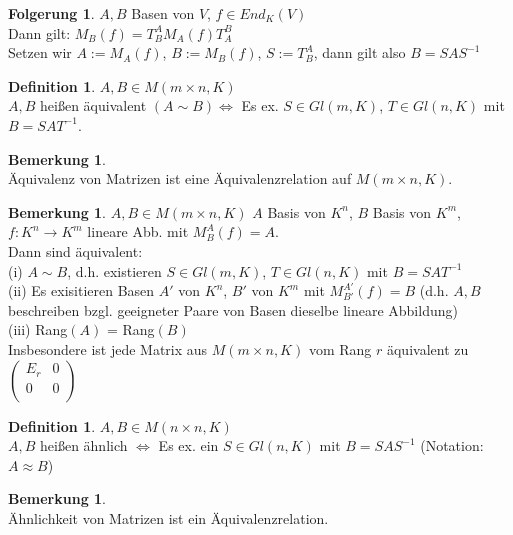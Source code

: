 \documentclass[10pt,a4paper,numbers=endperiod]{scrartcl}
\theoremstyle{definition}
\newtheorem{defi}[satz]{Definition}
\newtheorem{bem}[satz]{Bemerkung}
\newtheorem{folg}[satz]{Folgerung}
\begin{document}
\begin{folg}
	 $A,B$ Basen von $V$, $f \in End_K(V)$\\
	 Dann gilt: $M_B(f) = T_B^A M_A(f) T_A^B$\\
	 Setzen wir $A := M_A(f)$, $ B:= M_B(f)$, $S:= T_B^A$, dann gilt also $B=SAS^{-1}$
\end{folg}

\begin{defi}
	$A,B \in M( m\times n,K)$\\
	$A,B$ heißen äquivalent $(A \sim B) \Leftrightarrow$ Es ex. $S \in Gl(m,K)$, $T \in Gl(n,K)$ mit $B=SAT^{-1}$.
\end{defi}

\begin{bem}
	$ $\\
	Äquivalenz von Matrizen ist eine Äquivalenzrelation auf $M(m \times n, K)$.
\end{bem}

\begin{bem}
	$A,B \in M(m \times n, K)$ $A$ Basis von $K^n$, $B$ Basis von $K^m$, $f:K^n \rightarrow K^m$ lineare Abb. mit $M_B^A(f) = A$.\\
	Dann sind äquivalent:\\
	(i) $A \sim B$, d.h. existieren $S \in Gl(m,K)$, $T \in Gl(n,K)$ mit $B=SAT^{-1}$\\
	(ii) Es exisitieren Basen $A'$ von $K^n$, $B'$ von $K^m$ mit $M_{B'}^{A'}(f) =B$ (d.h. $A,B$ beschreiben bzgl. geeigneter Paare von Basen dieselbe lineare Abbildung)\\
	(iii) Rang$(A)$ = Rang$(B)$\\
	Insbesondere ist jede Matrix aus $M(m\times n, K)$ vom Rang $r$ äquivalent zu $\begin{pmatrix}
	E_r&0\\
	0&0\\
	\end{pmatrix}$
\end{bem}

\begin{defi}
	$A,B \in M(n \times n,K)$\\
	$A,B$ heißen ähnlich $\Leftrightarrow$ Es ex. ein $S \in Gl(n,K)$ mit $B=SAS^{-1}$ (Notation: $A \approx B$)
\end{defi}

\begin{bem}
	$ $ \\
	Ähnlichkeit von Matrizen ist ein Äquivalenzrelation.
\end{bem}
\end{document}
